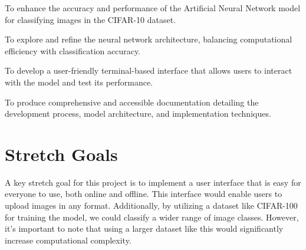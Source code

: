 \documentclass{article}
\begin{document}
\begin{inparaitem}  
\item To enhance the accuracy and performance of the Artificial Neural Network model for classifying 
images in the CIFAR-10 dataset.

\item To explore and refine the neural network architecture, balancing computational efficiency with 
classification accuracy.

\item To develop a user-friendly terminal-based interface that allows users to interact with the 
model and test its performance.

\item To produce comprehensive and accessible documentation detailing the development process, 
model architecture, and implementation techniques.
\end{inparaitem}

\section{Stretch Goals}

A key stretch goal for this project is to implement a user interface that is easy for everyone to use, 
both online and offline. This interface would enable users to upload images in any format. Additionally, 
by utilizing a dataset like CIFAR-100 for training the model, we could classify a wider range of image classes. 
However, it's important to note that using a larger dataset like this would significantly increase computational complexity.
\end{document}
